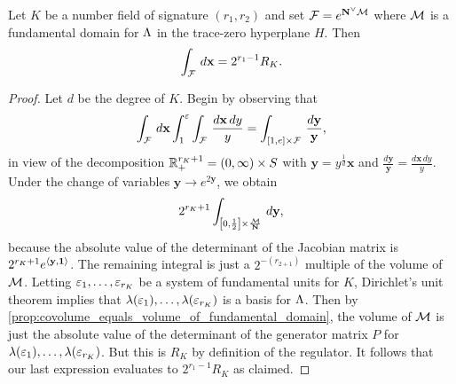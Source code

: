       \begin{lemma}\label{lem:integral_of_fundamental_domain_for_norm-one_hypersurface}
        Let $K$ be a number field of signature $(r_{1},r_{2})$ and set $\mathcal{F} = e^{\mathbf{N}^{\vee}\mathcal{M}}$ where $\mathcal{M}$ is a fundamental domain for $\Lambda$ in the trace-zero hyperplane $H$. Then
        \[
          \int_{\mathcal{F}}\,d\mathbf{x} = 2^{r_{1}-1}R_{K}.
        \]
      \end{lemma}
      \begin{proof}
        Let $d$ be the degree of $K$. Begin by observing that
        \[
          \int_{\mathcal{F}}\,d\mathbf{x} \int_{1}^{\varepsilon}\int_{\mathcal{F}}\,\frac{d\mathbf{x}\,dy}{y} = \int_{[1,e] \times \mathcal{F}}\,\frac{d\mathbf{y}}{\mathbf{y}},
        \]
        in view of the decomposition $\mathbb{R}_{+}^{r_{K}+1} = (0,\infty) \times S$ with $\mathbf{y} = y^{\frac{1}{d}}\mathbf{x}$ and $\frac{d\mathbf{y}}{\mathbf{y}} = \frac{d\mathbf{x}\,dy}{y}$. Under the change of variables $\mathbf{y} \to e^{2\mathbf{y}}$, we obtain
        \[
          2^{r_{K}+1}\int_{\left[0,\frac{1}{2}\right] \times \frac{\mathcal{M}}{\mathbf{N}}}\,d\mathbf{y},
        \]
        because the absolute value of the determinant of the Jacobian matrix is $2^{r_{K}+1}e^{\langle\mathbf{y},\mathbf{1}\rangle}$. The remaining integral is just a $2^{-(r_{2+1})}$ multiple of the volume of $\mathcal{M}$. Letting $\varepsilon_{1},\ldots,\varepsilon_{r_{K}}$ be a system of fundamental units for $K$, Dirichlet's unit theorem implies that $\lambda(\varepsilon_{1}),\ldots,\lambda(\varepsilon_{r_{K}})$ is a basis for $\Lambda$. Then by \cref{prop:covolume_equals_volume_of_fundamental_domain}, the volume of $\mathcal{M}$ is just the absolute value of the determinant of the generator matrix $P$ for $\lambda(\varepsilon_{1}),\ldots,\lambda(\varepsilon_{r_{K}})$. But this is $R_{K}$ by definition of the regulator. It follows that our last expression evaluates to $2^{r_{1}-1}R_{K}$ as claimed.
      \end{proof}

